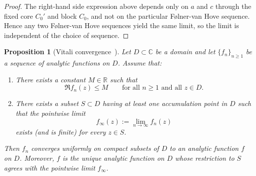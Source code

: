 \documentclass[a4paper,11pt]{article}
\theoremstyle{plain}
\newtheorem{proposition}[theorem]{Proposition}
\theoremstyle{definition}
\theoremstyle{remark}
\newcommand{\1}{\mathbf{1}}
\begin{document}
\begin{proof}
The right-hand side expression above depends only on $a$ and $c$ through the fixed core $C_0'$ and block $C_0$,
and not on the particular Følner-van Hove sequence. Hence any two Følner-van Hove sequences yield the same limit,
so the limit is independent of the choice of sequence.
\end{proof}

\begin{proposition}[Vitali convergence~\cite{scott2005repulsive}]
\label{prop:vitali-scott-sokal}
Let $D\subset\mathbb{C}$ be a domain and let $\{f_n\}_{n\ge 1}$ be a sequence of analytic functions on $D$.
Assume that:
\begin{enumerate}
  \item[(a)] There exists a constant $M\in\mathbb{R}$ such that
  \[
    \Re f_n(z) \le M \qquad \text{for all } n\ge 1 \text{ and all } z\in D .
  \]
  \item[(b)] There exists a subset $S\subset D$ having at least one accumulation point in $D$ such that the pointwise limit
  \[
    f_\infty(z):=\lim_{n\to\infty} f_n(z)
  \]
  exists (and is finite) for every $z\in S$.
\end{enumerate}
Then $f_n$ converges uniformly on compact subsets of $D$ to an analytic function $f$ on $D$.
Moreover, $f$ is the unique analytic function on $D$ whose restriction to $S$ agrees with the pointwise limit $f_\infty$.
\end{proposition}
\end{document}
